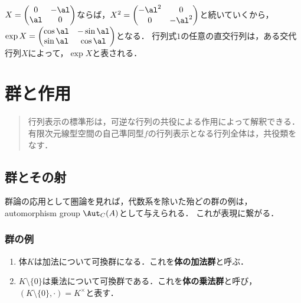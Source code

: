 \documentclass[uplatex, dvipdfmx]{jsreport}
\begin{document}
\begin{example}
    $X=\begin{pmatrix}0&-\al\\\al&0\end{pmatrix}$ならば，$X^2=\begin{pmatrix}-\al^2&0\\0&-\al^2\end{pmatrix}$と続いていくから，$\exp X=\begin{pmatrix}\cos\al&-\sin\al\\\sin\al&\cos\al\end{pmatrix}$となる．
    行列式$1$の任意の直交行列は，ある交代行列$X$によって，$\exp X$と表される．
\end{example}

\chapter{群と作用}

\begin{quotation}
    行列表示の標準形は，可逆な行列の共役による作用によって解釈できる．有限次元線型空間の自己準同型$f$の行列表示となる行列全体は，共役類をなす．
\end{quotation}

\section{群とその射}

\begin{tcolorbox}[colframe=ForestGreen, colback=ForestGreen!10!white, breakable]
    群論の応用として圏論を見れば，代数系を除いた殆どの群の例は，automorphism group $\Aut_C(A)$として与えられる．
    これが表現に繋がる．
\end{tcolorbox}

\subsection{群の例}

\begin{example}\mbox{}
    \begin{enumerate}
        \item 体$K$は加法について可換群になる．これを\textbf{体の加法群}と呼ぶ．
        \item $K\setminus\{0\}$は乗法について可換群である．これを\textbf{体の乗法群}と呼び，$(K\setminus\{0\},\cdot)=K^\times$と表す．
    \end{enumerate}
\end{example}
\end{document}
